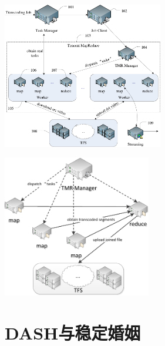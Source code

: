 \documentclass{beamer}
\begin{document}
\begin{frame}
\begin{center}
\includegraphics[height=6.4cm]{fig/TranscX.pdf}
\end{center}
\end{frame}
\begin{frame}
\begin{center}
\includegraphics[height=6.2cm]{fig/TranscX_detail.pdf}
\end{center}
\end{frame}

\section{DASH与稳定婚姻}
\end{document}
